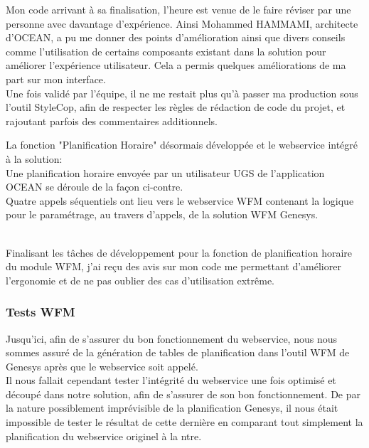 \documentclass{rapport}
\begin{document}
Mon code arrivant à sa finalisation, l'heure est venue de le faire réviser par une personne avec davantage d'expérience. Ainsi Mohammed HAMMAMI, architecte d'OCEAN, a pu me donner des points d'amélioration ainsi que divers conseils comme l'utilisation de certains composants existant dans la solution pour améliorer l'expérience utilisateur. Cela a permis quelques améliorations de ma part sur mon interface.\\

Une fois validé par l'équipe, il ne me restait plus qu'à passer ma production sous l'outil StyleCop, afin de respecter les règles de rédaction de code du projet, et rajoutant parfois des commentaires additionnels.\\

\begin{minipage}{0.55\textwidth}
\end{minipage}
\begin{minipage}{0.35\textwidth}
La fonction "Planification Horaire" désormais développée et le webservice intégré à la solution:\\

Une planification horaire envoyée par un utilisateur UGS de l'application OCEAN se déroule de la façon ci-contre.\\

Quatre appels séquentiels ont lieu vers le webservice WFM contenant la logique pour le paramétrage, au travers d'appels, de la solution WFM Genesys.

\end{minipage}
\vspace{5mm} %
\\

Finalisant les tâches de développement pour la fonction de planification horaire du module WFM, j'ai reçu des avis sur mon code me permettant d'améliorer l'ergonomie et de ne pas oublier des cas d'utilisation extrême.

\subsubsection{Tests WFM}

Jusqu'ici, afin de s'assurer du bon fonctionnement du webservice, nous nous sommes assuré de la génération de tables de planification dans l'outil WFM de Genesys après que le webservice soit appelé.\\
Il nous fallait cependant tester l'intégrité du webservice une fois optimisé et découpé dans notre solution, afin de s'assurer de son bon fonctionnement. De par la nature possiblement imprévisible de la planification Genesys, il nous était impossible de tester le résultat de cette dernière en comparant tout simplement la planification du webservice originel à la ntre.\\
\end{document}

